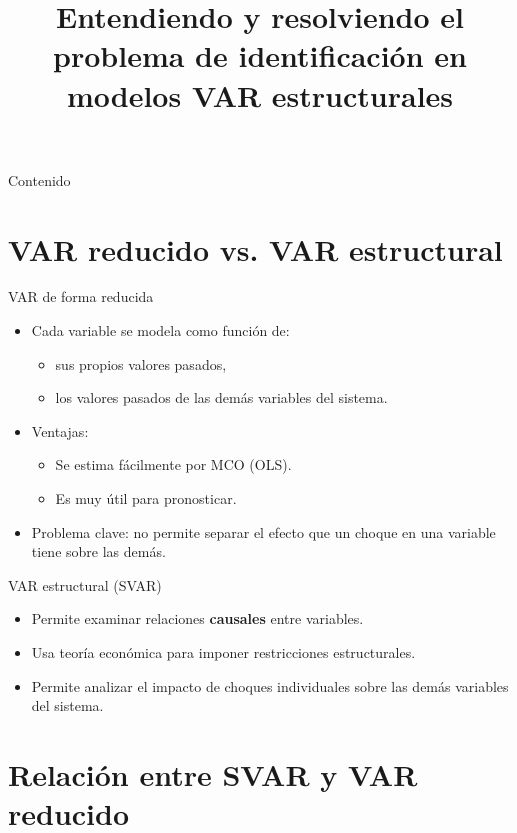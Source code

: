 \documentclass[11pt]{beamer}
\title[Identificación en modelos SVAR]{Entendiendo y resolviendo el problema de identificación en modelos VAR estructurales}
\author{}
\date{}
\begin{document}
\frame{\titlepage}

\begin{frame}{Contenido}
\tableofcontents
\end{frame}

\section{VAR reducido vs. VAR estructural}

\begin{frame}{VAR de forma reducida}
\begin{itemize}
    \item Cada variable se modela como función de:
    \begin{itemize}
        \item sus propios valores pasados,
        \item los valores pasados de las demás variables del sistema.
    \end{itemize}
    \item Ventajas:
    \begin{itemize}
        \item Se estima fácilmente por MCO (OLS).
        \item Es muy útil para pronosticar.
    \end{itemize}
    \item Problema clave: no permite separar el efecto que un choque en una variable tiene sobre las demás.
\end{itemize}
\end{frame}

\begin{frame}{VAR estructural (SVAR)}
\begin{itemize}
    \item Permite examinar relaciones \textbf{causales} entre variables.
    \item Usa teoría económica para imponer restricciones estructurales.
    \item Permite analizar el impacto de choques individuales sobre las demás variables del sistema.
\end{itemize}
\end{frame}

\section{Relación entre SVAR y VAR reducido}
\end{document}
